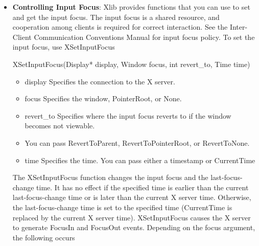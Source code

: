 \documentclass{report}
\begin{document}
\begin{itemize}
            \bigbreak \noindent 
            There is seldom any reason for calling this function. The pointer should normally be left to the user. If you do use this function, however, it generates events just as if the user had instantaneously moved the pointer from one position to another. Note that you cannot use XWarpPointer to move the pointer outside the confine\_to window of an active pointer grab. An attempt to do so will only move the pointer as far as the closest edge of the confine\_to window.
            \bigbreak \noindent 
            XWarpPointer can generate a BadWindow error.
        \item \textbf{Controlling Input Focus}:  Xlib provides functions that you can use to set and get the input focus. The input focus is a shared resource, and cooperation among clients is required for correct interaction. See the Inter-Client Communication Conventions Manual for input focus policy.
            \bigbreak \noindent 
            To set the input focus, use XSetInputFocus
            \bigbreak \noindent 
            \begin{cppcode}
            XSetInputFocus(Display* display, Window focus, int revert_to, Time time)
            \end{cppcode}
            \bigbreak \noindent
            \begin{itemize}
                \item display Specifies the connection to the X server.
                \item focus Specifies the window, PointerRoot, or None.
                \item revert\_to Specifies where the input focus reverts to if the window becomes not viewable.
                \item You can pass RevertToParent, RevertToPointerRoot, or RevertToNone.
                \item time Specifies the time. You can pass either a timestamp or CurrentTime
            \end{itemize}
            The XSetInputFocus function changes the input focus and the last-focus-change time. It has no effect if the specified time is earlier than the current last-focus-change time or is later than the current X server time. Otherwise, the last-focus-change time is set to the specified time (CurrentTime is replaced by the current X server time). XSetInputFocus causes the X server to generate FocusIn and FocusOut events.
            \bigbreak \noindent 
            Depending on the focus argument, the following occurs

\end{itemize}
\end{document}

